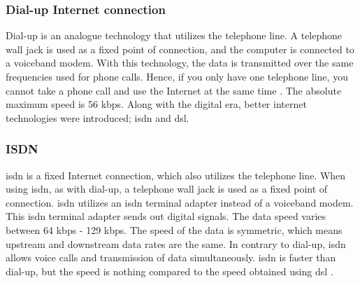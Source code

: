 \subsubsection{Dial-up Internet connection}
Dial-up is an analogue technology that utilizes the telephone line. A telephone wall jack is used as a fixed point of connection, and the computer is connected to a voiceband modem. With this technology, the data is transmitted over the same frequencies used for phone calls. Hence, if you only have one telephone line, you cannot take a phone call and use the Internet at the same time \cite{differentuplinks}. The absolute maximum speed is 56 \gls{kbps}. Along with the digital era, better internet technologies were introduced; \gls{isdn} and \gls{dsl}. 

\subsubsection{ISDN}
\gls{isdn} is a fixed Internet connection, which also utilizes the telephone line. When using \gls{isdn}, as with dial-up, a telephone wall jack is used as a fixed point of connection. \gls{isdn} utilizes an \gls{isdn} terminal adapter instead of a voiceband modem. This \gls{isdn} terminal adapter sends out digital signals. The data speed varies between 64 \gls{kbps} - 129 \gls{kbps}. The speed of the data is symmetric, which means upstream and downstream data rates are the same. In contrary to dial-up, \gls{isdn} allows voice calls and transmission of data simultaneously. \gls{isdn} is faster than dial-up, but the speed is nothing compared to the speed obtained using \gls{dsl} \cite{differentuplinks}. 


